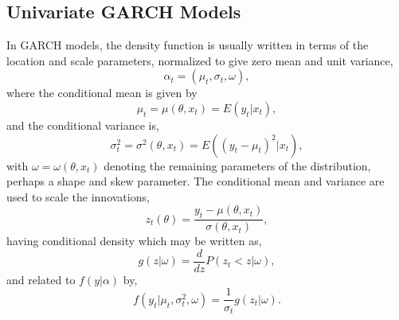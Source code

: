 \subsection{Univariate GARCH Models}\label{section:ugarch}
In GARCH models, the density function is usually written in terms of the
location and scale parameters, normalized to give zero mean and  unit variance,
\begin{equation}\label{garchdensity1}
{\alpha _t} = ({\mu_t},{\sigma_t},{\omega}),
\end{equation}
where the conditional mean is given by
\begin{equation}\label{garchdensity2}
{\mu _t} = \mu (\theta ,{x_t}) = E({y_t}|{x_t}),
\end{equation}
and the conditional variance is,
\begin{equation}\label{garchdensity3}
\sigma _t^2 = {\sigma ^2}(\theta ,{x_t}) = E({({y_t} - {\mu _t})^2}|{x_t}),
\end{equation}
with ${\omega} = \omega (\theta ,{x_t})$ denoting the remaining parameters of
the distribution, perhaps a shape and skew parameter. The conditional mean and
variance are used to scale the innovations,
\begin{equation}\label{garchdensity4}
{z_t}(\theta ) = \frac{{{y_t} - \mu (\theta ,{x_t})}}{{\sigma (\theta ,{x_t})}},
\end{equation}
having conditional density which may be written as,
\begin{equation}\label{garchdensity5}
g(z|{\omega}) = \frac{d}{{dz}}P({z_t} < z|{\omega}),
\end{equation}
and related to $f(y|\alpha)$ by,
\begin{equation}\label{garchdensity6}
f({y_t}|{\mu _t},\sigma _t^2,{\omega}) = \frac{1}{{{\sigma_t}}}g({z_t}|{\omega}).
\end{equation}

